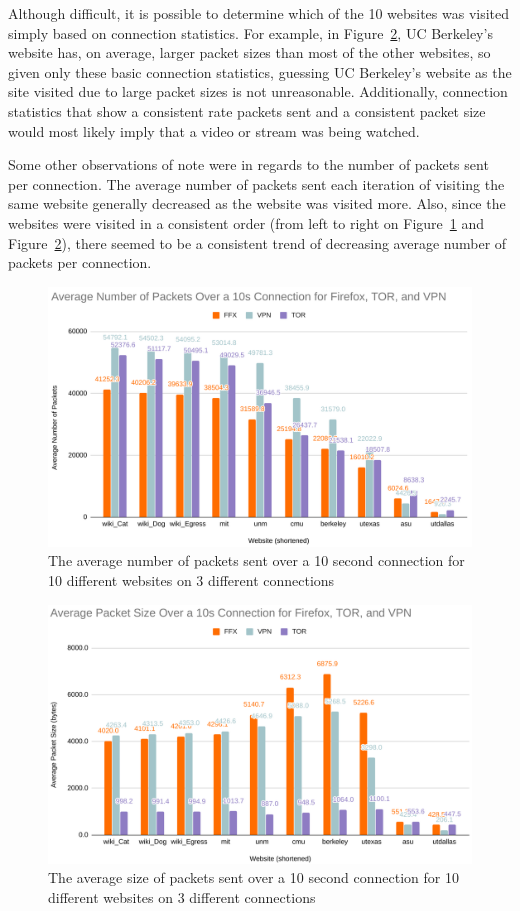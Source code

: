 \documentclass[11pt]{article}
\begin{document}
Although difficult, it is possible to determine which of the 10 websites was visited simply based on
connection statistics. For example, in Figure~\ref{fig:avg_size}, UC Berkeley's website has, on average,
larger packet sizes than most of the other websites, so given only these basic connection statistics,
guessing UC Berkeley's website as the site visited due to large packet sizes is not unreasonable.
Additionally, connection statistics that show a consistent rate packets sent and a consistent packet
size would most likely imply that a video or stream was being watched.

Some other observations of note were in regards to the number of packets sent per connection. The 
average number of packets sent each iteration of visiting the same website generally decreased as the
website was visited more. Also, since the websites were visited in a consistent order (from left to 
right on Figure~\ref{fig:avg_packets} and Figure~\ref{fig:avg_size}), there seemed to be a consistent
trend of decreasing average number of packets per connection. 
\begin{figure}[p]
  \centering
  \includegraphics[width=1\linewidth]{./average_packets.png}
  \caption{\label{fig:avg_packets}
  The average number of packets sent over a 10 second connection for 10 different websites on 3 different connections}
\end{figure}
\begin{figure}[p]
  \centering
  \includegraphics[width=1\linewidth]{./average_size.png}
  \caption{\label{fig:avg_size}
  The average size of packets sent over a 10 second connection for 10 different websites on 3 different connections}
\end{figure}
\end{document}
